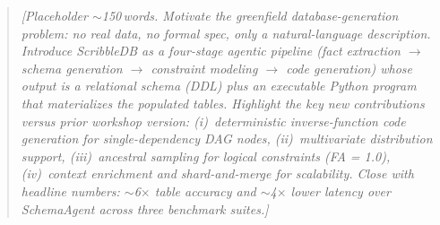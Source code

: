 \begin{abstract}
\textit{[Placeholder $\sim$150\,words. Motivate the greenfield database-generation problem: no
real data, no formal spec, only a natural-language description.
Introduce ScribbleDB as a four-stage agentic pipeline
(fact extraction $\to$ schema generation $\to$ constraint modeling $\to$ code generation)
whose output is a relational schema (DDL) plus an executable Python program that materializes
the populated tables.
Highlight the key new contributions versus prior workshop version:
(i)~deterministic inverse-function code generation for single-dependency DAG nodes,
(ii)~multivariate distribution support,
(iii)~ancestral sampling for logical constraints (FA = 1.0),
(iv)~context enrichment and shard-and-merge for scalability.
Close with headline numbers: $\sim$6$\times$ table accuracy and $\sim$4$\times$ lower latency
over SchemaAgent across three benchmark suites.]}
\end{abstract}